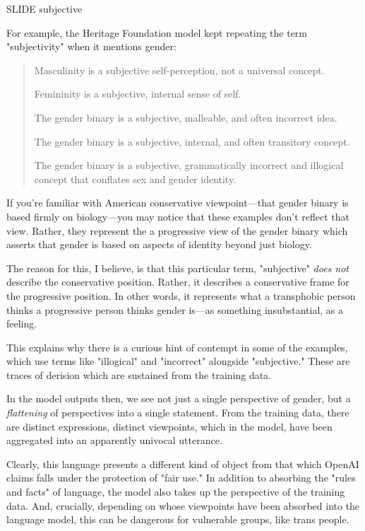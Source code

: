 \documentclass[11pt]{article}
\begin{document}
SLIDE subjective

For example, the Heritage Foundation model kept repeating the term
"subjectivity" when it mentions gender:

\begin{quote}
Masculinity is a subjective self-perception, not a universal
concept.

Femininity is a subjective, internal sense of self.

The gender binary is a subjective, malleable, and often incorrect
idea.

The gender binary is a subjective, internal, and often transitory
concept.

The gender binary is a subjective, grammatically incorrect and
illogical concept that conflates sex and gender identity.
\end{quote}

If you're familiar with American conservative viewpoint---that gender
binary is based firmly on biology---you may notice that these examples
don't reflect that view. Rather, they represent the a progressive view
of the gender binary which asserts that gender is based on aspects of
identity beyond just biology.

The reason for this, I believe, is that this particular term,
"subjective" \emph{does not} describe the conservative position. Rather, it
describes a conservative frame for the progressive position. In other
words, it represents what a transphobic person thinks a progressive
person thinks gender is---as something insubstantial, as a feeling.

This explains why there is a curious hint of contempt in some of the
examples, which use terms like "illogical" and "incorrect" alongside
"subjective." These are traces of derision which are sustained from
the training data.

In the model outputs then, we see not just a single perspective of
gender, but a \emph{flattening} of perspectives into a single statement.
From the training data, there are distinct expressions, distinct
viewpoints, which in the model, have been aggregated into an
apparently univocal utterance.

Clearly, this language presents a different kind of object from that
which OpenAI claims falls under the protection of "fair use." In
addition to absorbing the "rules and facts" of language, the model
also takes up the perspective of the training data. And, crucially,
depending on whose viewpoints have been absorbed into the language
model, this can be dangerous for vulnerable groups, like trans people.
\end{document}
